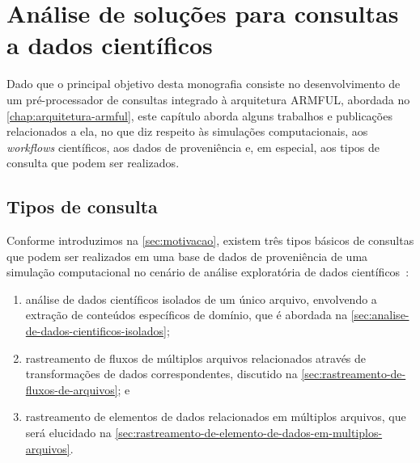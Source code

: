 


\chapter{Análise de soluções para consultas a dados científicos}%
\label{chap:analise-solucoes-consultas-dados-cientificos}

Dado que o principal objetivo desta monografia consiste no desenvolvimento de um pré-processador de consultas integrado à arquitetura ARMFUL, abordada no \autoref{chap:arquitetura-armful}, este capítulo aborda alguns trabalhos e publicações relacionados a ela, no que diz respeito às simulações computacionais, aos \textit{workflows} científicos, aos dados de proveniência e, em especial, aos tipos de consulta que podem ser realizados.

\section{Tipos de consulta}%
\label{sec:tipos-de-consulta}

Conforme introduzimos na \autoref{sec:motivacao}, existem três tipos básicos de consultas que podem ser realizados em uma base de dados de proveniência de uma simulação computacional no cenário de análise exploratória de dados científicos~\cite{silva2015analyzing,silva2015propostadoutorado}:

\begin{enumerate}
    \item análise de dados científicos isolados de um único arquivo, envolvendo a extração de conteúdos específicos de domínio, que é abordada na \autoref{sec:analise-de-dados-cientificos-isolados};
    \item rastreamento de fluxos de múltiplos arquivos relacionados através de transformações de dados correspondentes, discutido na \autoref{sec:rastreamento-de-fluxos-de-arquivos}; e
    \item rastreamento de elementos de dados relacionados em múltiplos arquivos, que será elucidado na \autoref{sec:rastreamento-de-elemento-de-dados-em-multiplos-arquivos}.
\end{enumerate}

